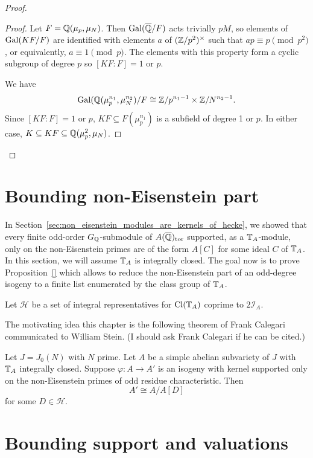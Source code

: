 \documentclass[thesis.tex]{subfiles}
\begin{document}
\begin{proof}
\begin{proof}
        Let $F=\mathbb{Q}(\mu_p, \mu_N)$. Then $\operatorname{Gal}(\overline{\mathbb{Q}}/F)$ acts trivially $pM$,
        so elements of $\operatorname{Gal}(KF/F)$ are identified with elements $a$ of 
        $(\mathbb{Z}/p^2)^\times$ such that $ap\equiv p \pmod{p^2}$, or equivalently,
        $a\equiv 1 \pmod{p}$. The elements with this property form a cyclic
        subgroup of degree $p$ so $[KF:F]=1$ or $p$.

        We have 
        \[
            \operatorname{Gal}(\mathbb{Q}(\mu_p ^{n_1}, \mu_N ^{n_2})/F \cong \mathbb{Z}/p^{n_1-1} \times
            \mathbb{Z}/N^{n_2-1}.
        \]
        Since $[KF:F]=1$ or $p$, $KF\subseteq F(\mu_p ^{n_1})$ is a subfield of
        degree 1 or $p$. In either case, $K\subseteq KF \subseteq \mathbb{Q}(\mu_p ^2,
        \mu_N)$.
    \end{proof}
\end{proof}





\section{Bounding non-Eisenstein part}%
\label{sec:bounding_non_eisenstein_part}

In Section~\ref{sec:non_eisenstein_modules_are_kernels_of_hecke}, we showed
that every finite odd-order $G_{\mathbb{Q}}$-submodule of $A(\overline{\mathbb{Q}})_{\mathrm{tor}}$ supported, as
a $\mathbb{T}_A$-module, only on the non-Eisenstein primes are of the form $A[C]$ for
some ideal $C$ of $\mathbb{T}_A$. In this section, we will assume $\mathbb{T}_A$ is
integrally closed. The goal now is to prove Proposition~\ref{} which
allows to reduce the non-Eisenstein part of an odd-degree isogeny to a finite
list enumerated by the class group of $\mathbb{T}_A$. 

Let $\mathcal{H}$ be a set of integral representatives for $\operatorname{Cl}(\mathbb{T}_A)$ coprime
to $2\mathcal{I}_A$.

The motivating idea this chapter is the following theorem of Frank Calegari
communicated to William Stein. (I should ask Frank Calegari if he can be
cited.)
\begin{theorem}[F. Calegari]
    Let $J=J_0(N)$ with $N$ prime. Let $A$ be a simple abelian subvariety of
    $J$ with $\mathbb{T}_A$ integrally closed. Suppose $\varphi:A\to A'$ is an isogeny
    with kernel supported only on the non-Eisenstein primes of odd residue
    characteristic. Then
    \[
        A' \cong A/A[D]
    \]
    for some $D\in \mathcal{H}$.
\end{theorem}


\section{Bounding support and valuations}%
\label{sec:bounding_support_and_valuations}
\end{document}
